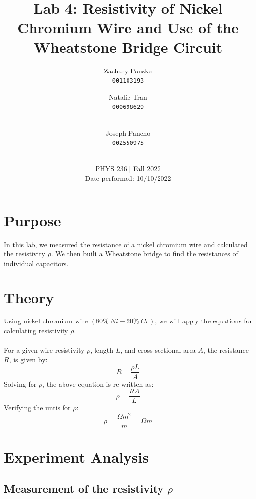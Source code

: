 \documentclass[titlepage]{article}
\begin{document}
\title{\textbf{Lab 4: Resistivity of Nickel Chromium Wire and Use of the Wheatstone Bridge Circuit}}
\author{
    Zachary Pouska\\
    \texttt{001103193}\\
    \and
    Natalie Tran \\ 
    \texttt{000698629}\\ \\
    \and
    Joseph Pancho\\
    \texttt{002550975} \\ \\
} 

\date{PHYS 236 | Fall 2022\\
Date performed: 10/10/2022}


	\maketitle



	\section{Purpose}
	In this lab, we measured the resistance of a nickel chromium wire 
	and calculated the resistivity $\rho$. We then built a Wheatstone 
	bridge to find the resistances of individual capacitors.

	\section{Theory}
	Using nickel chromium wire $(80\%~Ni- 20\%~Cr)$, we will apply the 
	equations for calculating resistivity $\rho$. \\
	~\\
	For a given wire resistivity $\rho$, length $L$, and cross-sectional 
	area $A$, the resistance $R$, is given by: \\
	\[
		R=\frac{\rho L}{A}
	\]
	Solving for $\rho$, the above equation is re-written as:
	\[
		\rho = \frac{RA}{L}
	\]	 
	Verifying the untis for $\rho$: 
	\[
		\rho=\frac{\Omega m^2}{m}=\Omega m	
	\]



	\section{Experiment Analysis}
        
        \subsection{Measurement of the resistivity $\rho$} 
\end{document}
